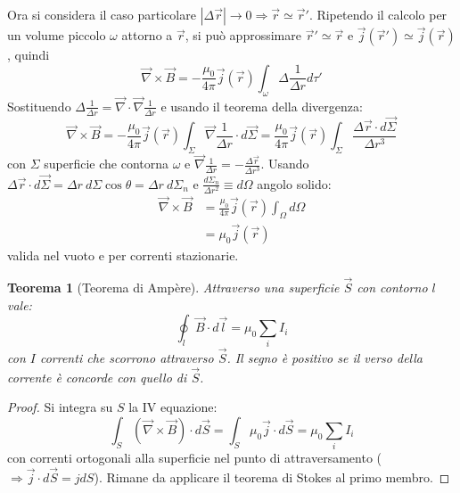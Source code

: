 \documentclass[a4paper]{scrartcl}
\numberwithin{equation}{subsection}
\theoremstyle{style1}
\newtheorem{teorema}{Teorema}[section]
\newenvironment{boxenv}[1][]{
    \begin{eqbox}[#1]
    }{
   \end{eqbox}
}
\begin{document}
Ora si considera il caso particolare $|\Delta \vec{r}| \to 0 \Rightarrow \vec{r} \simeq \vec{r}'$. Ripetendo il calcolo per un volume piccolo $\omega$ attorno a $\vec{r}$, si pu\`o approssimare $\vec{r}' \simeq \vec{r}$ e $\vec{j}(\vec{r}') \simeq \vec{j}(\vec{r})$, quindi
\begin{equation}
	\vec{\nabla }\times \vec{B} = -\frac{\mu_0}{4\pi}\vec{j}(\vec{r}) \int_{\omega} \Delta  \frac{1}{\Delta  r} d\tau '
\end{equation}
Sostituendo $\Delta \frac{1}{\Delta r} = \vec{\nabla }\cdot \vec{\nabla }\frac{1}{\Delta r}$ e usando il teorema della divergenza:
\begin{equation}
	\vec{\nabla }\times \vec{B} =- \frac{\mu_0}{4\pi} \vec{j}(\vec{r}) \int_{\Sigma} \vec{\nabla }\frac{1}{\Delta r} \cdot d\vec{\Sigma} =\frac{\mu_0}{4\pi} \vec{j}(\vec{r}) \int_{\Sigma} \frac{\Delta \vec{r}\cdot d\vec{\Sigma}}{\Delta r^3}
\end{equation}
con $\Sigma$ superficie che contorna $\omega$ e $\vec{\nabla }\frac{1}{\Delta r} = - \frac{\Delta \vec{r}}{\Delta r^3}$. Usando $\Delta \vec{r}\cdot d\vec{\Sigma}= \Delta r\ d\Sigma \cos \theta  = \Delta r\ d\Sigma_n$ e $\frac{d\Sigma_n}{\Delta r^2}\equiv d\Omega $ angolo solido:
\begin{equation}
	\begin{split}
		\vec{\nabla }\times \vec{B} &= \frac{\mu_0}{4\pi} \vec{j}(\vec{r}) \int_{\Omega } d\Omega \\
					    & = \mu_0 \vec{j}(\vec{r})
	\end{split}
\end{equation}
valida nel vuoto e per correnti stazionarie.
\begin{teorema}
	[Teorema di Amp\`ere]
Attraverso una superficie $\vec{S}$ con contorno $l$ vale:
\begin{equation}
	\oint_{l} \vec{B}\cdot d\vec{l} = \mu_0	\sum_{i}^{} I_i
\end{equation}
con $I$ correnti che scorrono attraverso $\vec{S}$. Il segno \`e positivo se il verso della corrente \`e concorde con quello di $\vec{S}$.
\end{teorema}
\begin{boxenv}[]
\begin{proof}
	Si integra su $S$ la IV equazione:
	\begin{equation}
		\int_{S} (\vec{\nabla }\times \vec{B}) \cdot d\vec{S} = \int_{S}  \mu_0 \vec{j}\cdot d\vec{S} = \mu_0 \sum_{i}^{} I_i
	\end{equation}
	con correnti ortogonali alla superficie nel punto di attraversamento ($\Rightarrow \vec{j}\cdot d\vec{S} = j dS$). Rimane da applicare il teorema di Stokes al primo membro.
\end{proof}
\end{boxenv}
\end{document}
